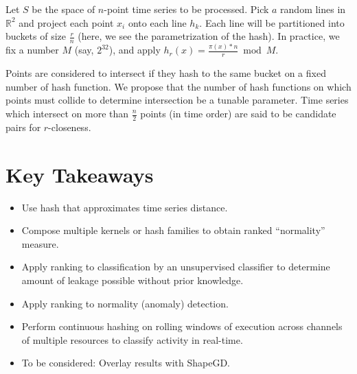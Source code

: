 \documentclass[a4paper]{article}
\theoremstyle{def}
\theoremstyle{thm}
\newcommand{\R}[0]{\mathbb{R}}
\begin{document}
Let $S$ be the space of $n$-point time series to be processed.
Pick $a$ random lines in $\R^2$ and project each point $x_i$ onto each line $h_k$.
Each line will be partitioned into buckets of size $\frac{r}{n}$ (here, we see the parametrization of the hash).
In practice, we fix a number $M$ (say, $2^{32}$), and apply $h_r(x) = \frac{\pi(x)*n}{r} \bmod M$. 

Points are considered to intersect if they hash to the same bucket on a fixed number of hash function.
We propose that the number of hash functions on which points must collide to determine intersection be a tunable parameter.
Time series which intersect on more than $\frac{n}{2}$ points (in time order) are said to be candidate pairs for $r$-closeness.

\section{Key Takeaways}

\begin{itemize}
    \item Use hash that approximates time series distance.
    \item Compose multiple kernels or hash families to obtain ranked ``normality'' measure.
    \item Apply ranking to classification by an unsupervised classifier to determine amount of leakage possible without prior knowledge.
    \item Apply ranking to normality (anomaly) detection.
    \item Perform continuous hashing on rolling windows of execution across channels of multiple resources to classify activity in real-time.
    \item To be considered: Overlay results with ShapeGD\@.
\end{itemize}



\end{document}
